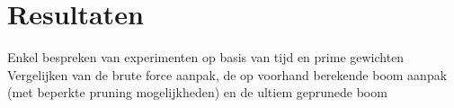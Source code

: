 \documentclass[Main.tex]{subfiles}
\begin{document}
\section{Resultaten}
Enkel bespreken van experimenten op basis van tijd en prime gewichten
Vergelijken van de brute force aanpak, de op voorhand berekende boom aanpak (met beperkte pruning mogelijkheden) en de ultiem geprunede boom
\end{document}
